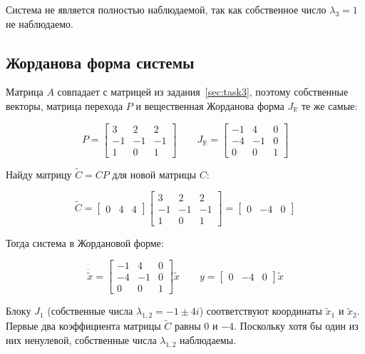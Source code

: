\documentclass[a4paper,12pt]{article}
\begin{document}
	Система не является полностью наблюдаемой, так как собственное число $\lambda_3 = 1$
	не наблюдаемо.
	
	
	\subsection{Жорданова форма системы}
	
	Матрица $A$ совпадает с матрицей из задания~\ref{sec:task3}, поэтому
	собственные векторы, матрица перехода $P$ и вещественная Жорданова форма
	$J_{\mathbb{R}}$ те же самые:
	
	\[
	P=
	\begin{bmatrix}
		3 & 2 & 2 \\
		-1 & -1 & -1 \\
		1 & 0 & 1
	\end{bmatrix}
	\qquad
	J_{\mathbb{R}} =
	\begin{bmatrix}
		-1 & 4 & 0 \\
		-4 & -1 & 0 \\
		0 & 0 & 1
	\end{bmatrix}
	\]
	
	Найду матрицу $\tilde{C} = CP$ для новой матрицы $C$:
	
	\[
	\tilde{C} =
	\begin{bmatrix}
		0 & 4 & 4
	\end{bmatrix}
	\begin{bmatrix}
		3 & 2 & 2 \\
		-1 & -1 & -1 \\
		1 & 0 & 1
	\end{bmatrix}
	=
	\begin{bmatrix}
		0 & -4 & 0
	\end{bmatrix}
	\]
	
	Тогда система в Жордановой форме:
	
	\[
	\dot{\tilde{x}} =
	\begin{bmatrix}
		-1 & 4 & 0 \\
		-4 & -1 & 0 \\
		0 & 0 & 1
	\end{bmatrix}
	\tilde{x}
	\qquad
	y =
	\begin{bmatrix}
		0 & -4 & 0
	\end{bmatrix}
	\tilde{x}
	\]
	
	Блоку $J_1$ (собственные числа $\lambda_{1,2} = -1 \pm 4i$)
	соответствуют координаты $\tilde{x}_1$ и $\tilde{x}_2$.
	Первые два коэффициента матрицы $\tilde{C}$ равны $0$ и $-4$.
	Поскольку хотя бы один из них ненулевой, собственные числа $\lambda_{1,2}$ наблюдаемы.
	
\end{document}
